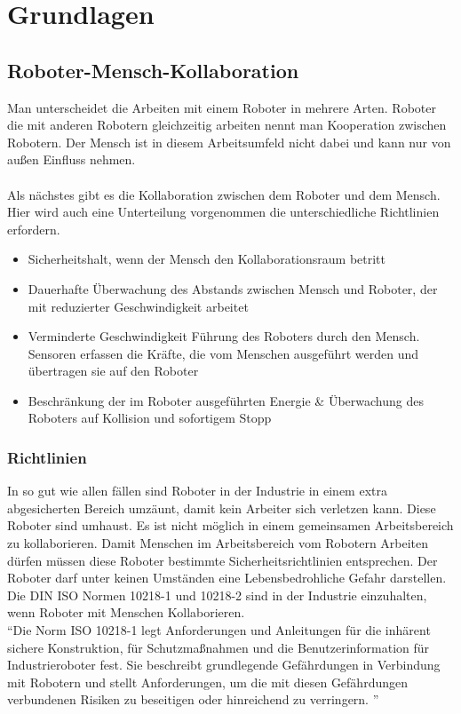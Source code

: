 \chapter{Grundlagen}

\section{Roboter-Mensch-Kollaboration}
\label{sec:roboter-mensch-kollaboration_gru}

Man unterscheidet die Arbeiten mit einem Roboter in mehrere Arten.
Roboter die mit anderen Robotern gleichzeitig arbeiten nennt man Kooperation zwischen Robotern.
Der Mensch ist in diesem Arbeitsumfeld nicht dabei und kann nur von außen Einfluss nehmen.
\\\\
Als nächstes gibt es die Kollaboration zwischen dem Roboter und dem Mensch.
Hier wird auch eine Unterteilung vorgenommen die unterschiedliche Richtlinien erfordern.

\begin{itemize}
\item Sicherheitshalt, wenn der Mensch den Kollaborationsraum betritt
\item Dauerhafte Überwachung des Abstands zwischen Mensch und Roboter, der mit reduzierter Geschwindigkeit arbeitet
\item Verminderte Geschwindigkeit Führung des Roboters durch den Mensch. Sensoren erfassen die Kräfte, die vom Menschen ausgeführt werden und übertragen sie auf den Roboter
\item Beschränkung der im Roboter ausgeführten Energie \& Überwachung des Roboters auf Kollision und sofortigem Stopp
\end{itemize}

\subsection{Richtlinien}
\label{kol_richtlinien_gru}

In so gut wie allen fällen sind Roboter in der Industrie in einem extra abgesicherten Bereich umzäunt, damit kein Arbeiter sich verletzen kann. Diese Roboter sind umhaust. Es ist nicht möglich in einem gemeinsamen Arbeitsbereich zu kollaborieren.
Damit Menschen im Arbeitsbereich vom Robotern Arbeiten dürfen müssen diese Roboter bestimmte Sicherheitsrichtlinien entsprechen.
Der Roboter darf unter keinen Umständen eine Lebensbedrohliche Gefahr darstellen. \\ Die DIN ISO Normen 10218-1 und 10218-2 sind in der Industrie einzuhalten, wenn Roboter mit Menschen Kollaborieren.
\\
``Die Norm ISO 10218-1 legt Anforderungen und Anleitungen für die inhärent sichere Konstruktion, für Schutzmaßnahmen und die Benutzerinformation für Industrieroboter fest. Sie beschreibt grundlegende Gefährdungen in Verbindung mit Robotern und stellt Anforderungen, um die mit diesen Gefährdungen verbundenen Risiken zu beseitigen oder hinreichend zu verringern. '' \cite{DINISO-2012}

